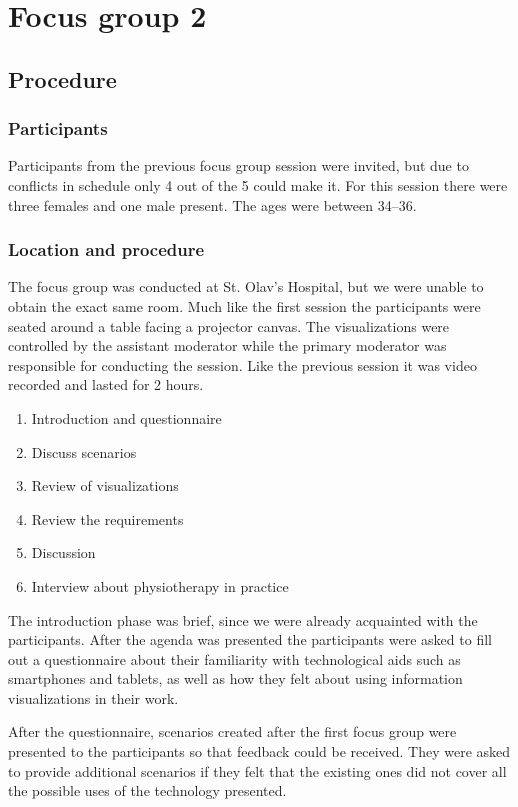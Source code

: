 \chapter{Focus group 2}
\label{ch:focusGroup2}

\section{Procedure}

\subsection{Participants}
Participants from the previous focus group session were invited, but due to conflicts in schedule only 4 out of the 5 could make it. For this session there were three females and one male present. The ages were between 34--36.

\subsection{Location and procedure}
The focus group was conducted at St. Olav's Hospital, but we were unable to obtain the exact same room.  Much like the first session the participants were seated around a table facing a projector canvas. The visualizations were controlled by the assistant moderator while the primary moderator was responsible for conducting the session. Like the previous session it was video recorded and lasted for 2 hours.

\begin{enumerate}[itemsep=0cm, parsep=0cm]
  \item Introduction and questionnaire
  \item Discuss scenarios
  \item Review of visualizations
  \item Review the requirements
  \item Discussion
  \item Interview about physiotherapy in practice
\end{enumerate}

The introduction phase was brief, since we were already acquainted with the participants. After the agenda was presented the participants were asked to fill out a questionnaire about their familiarity with technological aids such as smartphones and tablets, as well as how they felt about using information visualizations in their work. 

After the questionnaire, scenarios created after the first focus group were presented to the participants so that feedback could be received. They were asked to provide additional scenarios if they felt that the existing ones did not cover all the possible uses of the technology presented.

